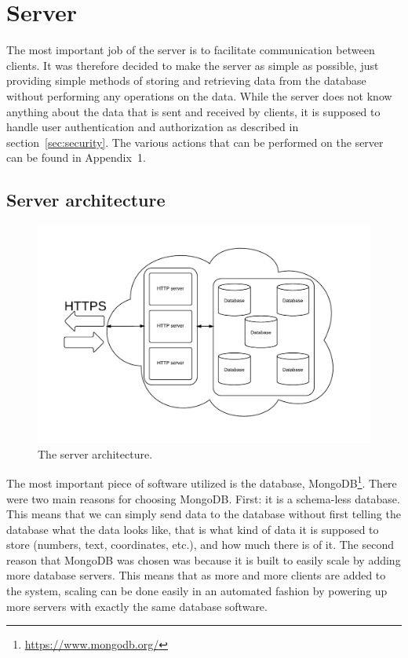 \section{Server}
The most important job of the server is to facilitate communication between clients.
It was therefore decided to make the server as simple as possible, just providing simple methods of storing and retrieving data from the database without performing any operations on the data.
While the server does not know anything about the data that is sent and received by clients, it is supposed to handle user authentication and authorization as described in section~\ref{sec:security}.
The various actions that can be performed on the server can be found in Appendix~1.

\subsection{Server architecture}
\begin{figure}[H]
\begin{center}
	\includegraphics[scale=0.75]{graphics/server.pdf}
	\caption{The server architecture.}
	\label{fig:server-architecture}
\end{center}
\end{figure}
The most important piece of software utilized is the database, MongoDB\footnote{\url{https://www.mongodb.org/}}.
There were two main reasons for choosing MongoDB.
First: it is a schema-less database.
This means that we can simply send data to the database without first telling the database what the data looks like, that is what kind of data it is supposed to store (numbers, text, coordinates, etc.), and how much there is of it.
The second reason that MongoDB was chosen was because it is built to easily scale by adding more database servers.
This means that as more and more clients are added to the system, scaling can be done easily in an automated fashion by powering up more servers with exactly the same database software.


